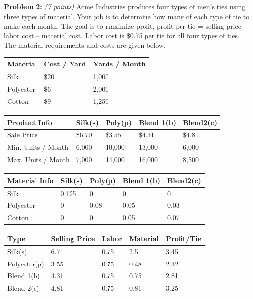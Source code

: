 \documentclass{article}
\begin{document}
\newpage

\noindent \textbf{Problem 2:} \textit{(7 points)} Acme Industries produces four types of men’s ties using three types of material. Your job is to determine how many of each type of tie to make each month. The goal is to maximize profit, profit per tie = selling price - labor cost – material cost. Labor cost is \$0.75 per tie for all four types of ties. The material requirements and costs are given below.\\

\begin{flushleft}
 \begin{tabular}{|| l | l | l ||}
 \hline
 Material & Cost / Yard & Yards / Month\\ 
 \hline\hline
 Silk & \$20 & 1,000 \\ 
 \hline
 Polyester & \$6 & 2,000 \\
 \hline
 Cotton & \$9 & 1,250 \\
 \hline
\end{tabular}
\end{flushleft}

\begin{flushleft}
 \begin{tabular}{|| l | l | l | l | l ||} 
 \hline
 Product Info & Silk(s) & Poly(p) & Blend 1(b)& Blend2(c)\\ 
 \hline\hline
 Sale Price & \$6.70 & \$3.55 & \$4.31 & \$4.81  \\ 
 \hline
 Min. Units / Month & 6,000 & 10,000 & 13,000 & 6,000 \\
 \hline
 Max. Units / Month & 7,000 & 14,000 & 16,000 & 8,500 \\
 \hline
 \end{tabular}
\end{flushleft}

\begin{flushleft}
 \begin{tabular}{|| l | l | l | l | l ||} 
 \hline
  Material Info & Silk(s) & Poly(p) & Blend 1(b)& Blend2(c)\\ 
 \hline\hline
 Silk & 0.125 & 0 & 0 & 0  \\ 
 \hline
 Polyester & 0 & 0.08 & 0.05 & 0.03 \\
 \hline
 Cotton & 0 & 0 & 0.05 & 0.07 \\
 \hline
 \end{tabular}
\end{flushleft}


\begin{flushleft}
 \begin{tabular}{|| l | l | l | l | l ||} 
 \hline
  Type & Selling Price & Labor & Material & Profit/Tie\\ 
 \hline\hline
 Silk(s) & 6.7 & 0.75 & 2.5 & 3.45  \\ 
 \hline
 Polyester(p) & 3.55 & 0.75 & 0.48 & 2.32 \\
 \hline
 Blend 1(b) & 4.31 & 0.75 & 0.75 & 2.81 \\
 \hline
 Blend 2(c) & 4.81 & 0.75 & 0.81 & 3.25 \\
 \hline
 \end{tabular}
\end{flushleft}
\end{document}
